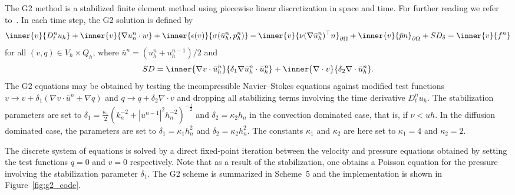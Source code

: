 The G2 method is a stabilized finite element method using piecewise
linear discretization in space and time. For further reading we refer
to~\cite{JohnsonHoffman}.  In each time step, the G2 solution is
defined by
\begin{equation*}
  \begin{split}
    \inner{v}{D_t^n u_h}
    + \inner{v}{\nabla u_n^n \cdot w}
    + \inner{\epsilon(v)}{\sigma(\bar{u}_h^n, p_h^n)}
    - \inner{v}{\nu (\nabla \bar{u}_h^n)^{\top} n}_{\partial\Omega}
    + \inner{v}{\bar{p} n}_{\partial\Omega}
    + SD_{\delta}
    = \inner{v}{f^n}
  \end{split}
\end{equation*}
for all $(v, q) \in V_h \times Q_h$, where $\bar{u}^{n} =
({u}^{n}_h + {u}^{n-1}_h) / 2$ and
\begin{equation*}
  SD
  = \inner{\nabla v \cdot \bar{u}_h^n}{\delta_1 \nabla \bar{u}_h^n \cdot \bar{u}_h^n}
  + \inner{\nabla \cdot v}{\delta_2 \nabla \cdot \bar{u}_h^n}.
\end{equation*}
The G2 equations may be obtained by testing the incompressible
Navier--Stokes equations against modified test functions $v
\rightarrow v + \delta_1 (\nabla v \cdot \bar{u}^{n} + \nabla q)$ and
$q \rightarrow q + \delta_2 \nabla \cdot v$ and dropping all
stabilizing terms involving the time derivative $D_t^n u_h$. The
stabilization parameters are set to $\delta_{1}
= \frac{\kappa_1}{2}(k_{n}^{-2} +
|u^{n-1}|^{2}h_{n}^{-2})^{-\frac{1}{2}}$ and $\delta_{2}= \kappa_2
h_n$ in the convection dominated case, that is, if $\nu < uh$. In the
diffusion dominated case, the parameters are set to $\delta_{1}
= \kappa_1 h_{n}^2$ and $\delta_{2} = \kappa_2 h_{n}^2$. The
constants $\kappa_1$ and $\kappa_2$ are here set to $\kappa_1 = 4$ and
$\kappa_2 = 2$.

The discrete system of equations is solved by a direct fixed-point
iteration between the velocity and pressure equations obtained by
setting the test functions $q = 0$ and $v = 0$ respectively. Note that
as a result of the stabilization, one obtains a Poisson equation for
the pressure involving the stabilization parameter $\delta_1$. The G2
scheme is summarized in Scheme~5 and the implementation is shown in
Figure~\ref{fig:g2_code}.

